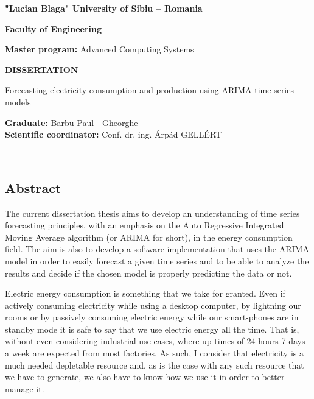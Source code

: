 \documentclass[12pt,a4paper,titlepage]{report}
\author{Barbu Paul - Gheorghe}
\begin{document}
\begin{titlepage}
{
	\centering
	\textbf{"Lucian Blaga" University of Sibiu – Romania} \\
}

{
	\centering
		\textbf{Faculty of Engineering} \\
}

{
	\centering
		\textbf{Master program:} Advanced Computing Systems \\
}


\vfill

{
	\centering
	\Large
	\textbf{DISSERTATION} \\
}

{
	\centering
	\Large
	Forecasting electricity consumption and production using ARIMA time series models \\
}

\vfill

{
	\centering
		\textbf{Graduate:} Barbu Paul - Gheorghe\\
		\textbf{Scientific coordinator:} Conf. dr. ing. Árpád GELLÉRT \\
}

\vfill

{
	 \\
}
\end{titlepage}

\tableofcontents
\newpage

\subsection*{Abstract}

The current dissertation thesis aims to develop an understanding of time series forecasting principles, with an emphasis on the Auto Regressive Integrated Moving Average algorithm (or ARIMA for short), in the energy consumption field. The aim is also to develop a software implementation that uses the ARIMA model in order to easily forecast a given time series and to be able to analyze the results and decide if the chosen model is properly predicting the data or not.

Electric energy consumption is something that we take for granted. Even if actively consuming electricity while using a desktop computer, by lightning our rooms or by passively consuming electric energy while our smart-phones are in standby mode it is safe to say that we use electric energy all the time. That is, without even considering industrial use-cases, where up times of 24 hours 7 days a week are expected from most factories. As such, I consider that electricity is a much needed depletable resource and, as is the case with any such resource that we have to generate, we also have to know how we use it in order to better manage it.
\end{document}
